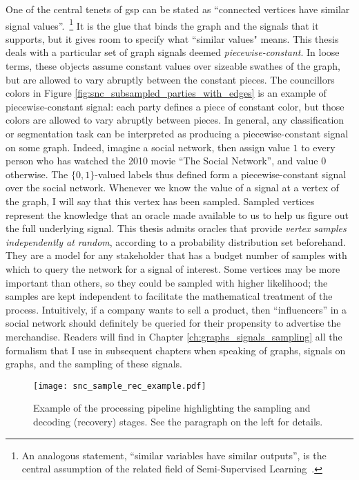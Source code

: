 One of the central tenets of \acrshort{gsp} can be stated as ``connected vertices have similar signal values''.~\footnote{An analogous statement, ``similar variables have similar outputs'', is the central assumption of the related field of Semi-Supervised Learning~\cite{chapelle2006}.} It is the glue that binds the graph and the signals that it supports, but it gives room to specify what ``similar values" means. This thesis deals with a particular set of graph signals deemed \emph{piecewise-constant}. In loose terms, these objects assume constant values over sizeable swathes of the graph, but are allowed to vary abruptly between the constant pieces. The councillors colors in Figure \ref{fig:snc_subsampled_parties_with_edges} is an example of piecewise-constant signal: each party defines a piece of constant color, but those colors are allowed to vary abruptly between pieces. In general, any classification or segmentation task can be interpreted as producing a piecewise-constant signal on some graph. Indeed, imagine a social network, then assign value $1$ to every person who has watched the 2010 movie ``The Social Network'', and value $0$ otherwise. The $\{0,1\}$-valued labels thus defined form a piecewise-constant signal over the social network. Whenever we know the value of a signal at a vertex of the graph, I will say that this vertex has been sampled. Sampled vertices represent the knowledge that an oracle made available to us to help us figure out the full underlying signal. This thesis admits oracles that provide \emph{vertex samples independently at random}, according to a probability distribution set beforehand. They are a model for any stakeholder that has a budget number of samples with which to query the network for a signal of interest. Some vertices may be more important than others, so they could be sampled with higher likelihood; the samples are kept independent to facilitate the mathematical treatment of the process. Intuitively, if a company wants to sell a product, then ``influencers'' in a social network should definitely be queried for their propensity to advertise the merchandise. Readers will find in Chapter \ref{ch:graphs_signals_sampling} all the formalism that I use in subsequent chapters when speaking of graphs, signals on graphs, and the sampling of these signals.

\begin{wrapfigure}{o}{0.35\textwidth}
    \centering
    \texttt{[image: snc\_sample\_rec\_example.pdf]}
    \caption[The processing pipeline highlighting the sampling and decoding stages]{Example of the processing pipeline highlighting the sampling and decoding (recovery) stages. See the paragraph on the left for details.}
    \label{fig:snc_sample_rec_example}
\end{wrapfigure}

